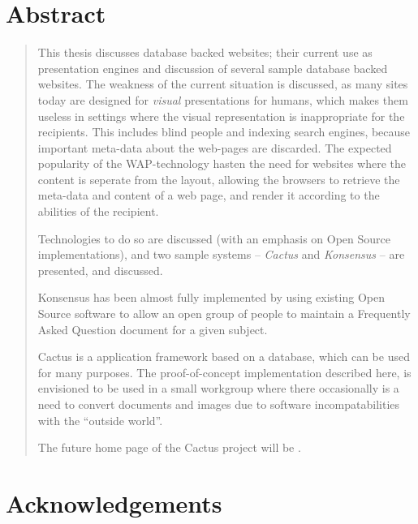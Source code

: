 \maketitle

\section*{Abstract}
\label{sec:abstract}


\begin{quote}
  This thesis discusses database backed websites; their current use as
  presentation engines and discussion of several sample database
  backed websites.  The weakness of the current situation is
  discussed, as many sites today are designed for \textit{visual}
  presentations for humans, which makes them useless in settings where
  the visual representation is inappropriate for the recipients.  This
  includes blind people and indexing search engines, because important
  meta-data about the web-pages are discarded.  The expected
  popularity of the WAP-technology hasten the need for websites where
  the content is seperate from the layout, allowing the browsers to
  retrieve the meta-data and content of a web page, and render it
  according to the abilities of the recipient.
  
  Technologies to do so are discussed (with an emphasis on Open Source
  implementations), and two sample systems -- \textit{Cactus} and
  \textit{Konsensus} -- are presented, and discussed.
  
  Konsensus has been almost fully implemented by using existing
  Open Source software to allow an open group of people to maintain a
  Frequently Asked Question document for a given subject.

  Cactus is a application framework based on a database, which can be
  used for many purposes.  The proof-of-concept implementation
  described here, is envisioned to be used in a small workgroup where
  there occasionally is a need to convert documents and images due to
  software incompatabilities with the ``outside world''.

  The future home page of the Cactus project will be
  .
\end{quote}


\section*{Acknowledgements}

